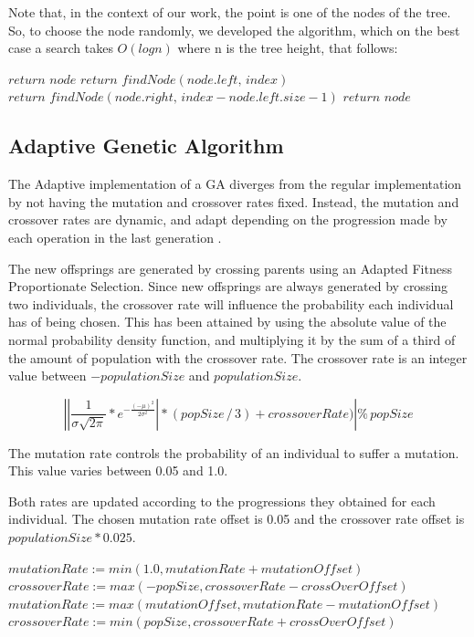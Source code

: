 \documentclass[runningheads]{llncs}
\begin{document}
Note that, in the context of our work, the point is one of the nodes of the tree. So, to choose the node randomly, we developed the algorithm, which on the best case a search takes $O(log n)$ where n is the tree height,  that follows:
\begin{algorithmic}
        \State $return \,\, node$
\Else 
           \State $return \,\, findNode(node.left,\,index)$
           \State $return \,\, findNode(node.right,\,index - node.left.size - 1)$
       \Else
	 \State $return \,\, node$
       \EndIf
\EndIf
\end{algorithmic}

\subsection{Adaptive Genetic Algorithm}
The Adaptive implementation of a GA diverges from the regular implementation by not having the mutation and crossover rates fixed. Instead, the mutation and crossover rates are dynamic, and adapt depending on the progression made by each operation in the last generation \cite{adaptativeCrossOverMutation}.

The new offsprings are generated by crossing parents using an Adapted Fitness Proportionate Selection. Since new offsprings are always generated by crossing two individuals, the crossover rate will influence the probability each individual has of being chosen. This has been attained by using the absolute value of the normal probability density function, and multiplying it by the sum of a third of the amount of population with the crossover rate. The crossover rate is an integer value between \(-populationSize\) and \(populationSize\).

\[ \left |\left | \frac{1}{\sigma \sqrt{2\pi}}*e^{-\frac{(-\mu)^2}{2\sigma^2}} \right | * (popSize\,/\,3) + crossoverRate)  \right | \%  \, popSize \]	

The mutation rate controls the probability of an individual to suffer a mutation. This value varies between 0.05 and 1.0.

Both rates are updated according to the progressions they obtained for each individual. The chosen mutation rate offset is 0.05 and the crossover rate offset is \(populationSize * 0.025\).

\begin{algorithmic}
        \State $mutationRate := min(1.0, mutationRate + mutationOffset)$
        \State $crossoverRate := max(-popSize, crossoverRate - crossOverOffset)$
\EndIf
{}
        \State $mutationRate := max(mutationOffset, mutationRate - mutationOffset)$
        \State $crossoverRate := min(popSize, crossoverRate + crossOverOffset)$
\EndIf
\end{algorithmic}
\end{document}
